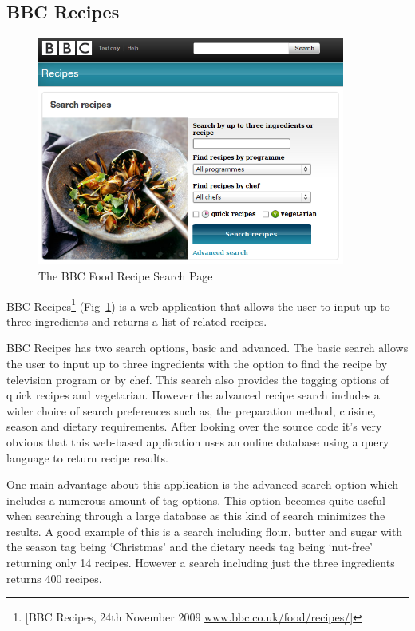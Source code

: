 \subsection{BBC Recipes}

\begin{figure}[h]
\includegraphics[width=0.9\textwidth]{screenshot_bbc_recipes}
\caption{The BBC Food Recipe Search Page}
\label{fig:bbc_food}
\end{figure}


BBC Recipes\footnote{[BBC Recipes, 24th November 2009 \url{www.bbc.co.uk/food/recipes/}]} (Fig~\ref{fig:bbc_food}) is a web application that allows the user to input up to three ingredients and returns a list of related recipes. 

BBC Recipes has two search options, basic and advanced. The basic search allows the user to input up to three ingredients with the option to find the recipe by television program or by chef. This search also provides the tagging options of quick recipes and vegetarian. However the advanced recipe search includes a wider choice of search preferences such as, the preparation method, cuisine, season and dietary requirements. After looking over the source code it’s very obvious that this web-based application uses an online database using a query language to return recipe results. 

One main advantage about this application is the advanced search option which includes a numerous amount of tag options. This option becomes quite useful when searching through a large database as this kind of search minimizes the results. A good example of this is a search including flour, butter and sugar with the season tag being ‘Christmas’ and the dietary needs tag being ‘nut-free’ returning only 14 recipes. However a search including just the three ingredients returns 400 recipes. 

